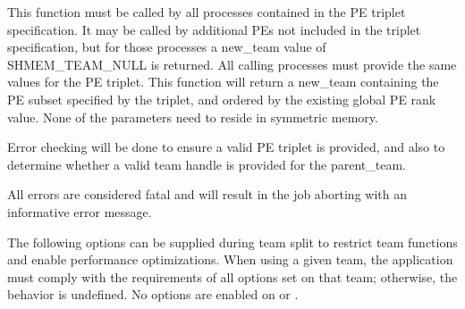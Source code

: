 \begin{apidefinition}
{This function must be called by all processes contained in the \ac{PE} triplet
specification. It may be called by additional \acp{PE} not included in the
triplet specification, but for those processes a new\_team value of
SHMEM\_TEAM\_NULL is returned. All calling processes must provide the
same values for the \ac{PE} triplet. This function will return a new\_team
containing the \ac{PE} subset specified by the triplet, and ordered by the
existing global \ac{PE} rank value. None of the parameters need to reside in
symmetric memory.

Error checking will be done to ensure a valid \ac{PE} triplet is provided,
and also to determine whether a valid team handle is provided for the
parent\_team.

All errors are considered fatal and will result in the job aborting with
an informative error message.

The following options can be supplied during team split to restrict
team functions and enable performance optimizations.  When using a given
team, the application must comply with the requirements of all options
set on that team; otherwise, the behavior is undefined.
No options are enabled on  or .

}



\begin{apiexamples}

\end{apiexamples}

\end{apidefinition}

